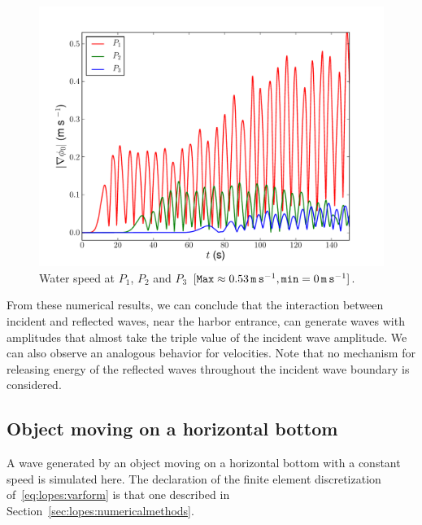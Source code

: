 \begin{figure}
\begin{center}
\includegraphics[width=\largefig]{chapters/lopes/pdf/velprofile.pdf}
\end{center}
\caption{Water speed at $P_1$, $P_2$ and $P_3$ $[{\tt
      Max}\approx 0.53\, {\tt m\, s}^{-1}, {\tt min}=0\,{\tt
      m\, s}^{-1}]$.}
\label{fig:lopes:velp}
\end{figure}

From these numerical results, we can conclude that the
interaction between incident and reflected waves, near the
harbor entrance, can generate waves with amplitudes that almost
take the triple value of the incident wave amplitude.  We
can also observe an analogous behavior for velocities.  Note
that no mechanism for releasing energy of the reflected
waves throughout the incident wave boundary is considered.


\subsection{Object moving on a horizontal bottom}
A wave generated by an object moving on a horizontal bottom
with a constant speed is simulated here.  The declaration of
the finite element discretization
of~\eqref{eq:lopes:varform}
is that one described in
Section~\ref{sec:lopes:numericalmethods}.

